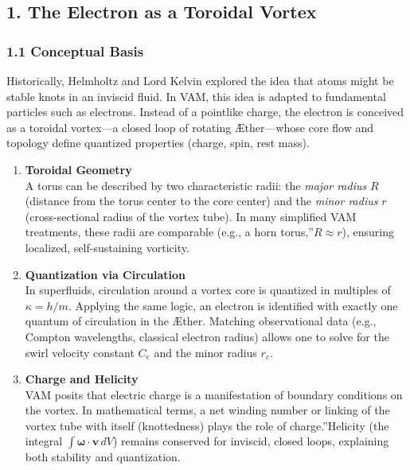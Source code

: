 \subsection*{1. The Electron as a Toroidal Vortex}

\subsubsection*{1.1 Conceptual Basis}
Historically, Helmholtz and Lord Kelvin explored the idea that atoms might be stable knots in an inviscid fluid. In VAM, this idea is adapted to fundamental particles such as electrons. Instead of a pointlike charge, the electron is conceived as a toroidal vortex—a closed loop of rotating Æther—whose core flow and topology define quantized properties (charge, spin, rest mass).

\begin{enumerate}
    \item \textbf{Toroidal Geometry} \\
    A torus can be described by two characteristic radii: the \textit{major radius} \(R\) (distance from the torus center to the core center) and the \textit{minor radius} \(r\) (cross-sectional radius of the vortex tube). In many simplified VAM treatments, these radii are comparable (e.g., a \grqq horn torus,\textquotedblright \(R \approx r\)), ensuring localized, self-sustaining vorticity.

    \item \textbf{Quantization via Circulation} \\
    In superfluids, circulation around a vortex core is quantized in multiples of \(\kappa = h/m\). Applying the same logic, an electron is identified with exactly one quantum of circulation in the Æther. Matching observational data (e.g., Compton wavelengths, classical electron radius) allows one to solve for the swirl velocity constant \(C_e\) and the minor radius \(r_c\).

    \item \textbf{Charge and Helicity} \\
    VAM posits that electric charge is a manifestation of boundary conditions on the vortex. In mathematical terms, a net winding number or linking of the vortex tube with itself (knottedness) plays the role of \grqq charge.\textquotedblright Helicity (the integral \(\int \boldsymbol{\omega}\cdot \mathbf{v}\, dV\)) remains conserved for inviscid, closed loops, explaining both stability and quantization.
\end{enumerate}

